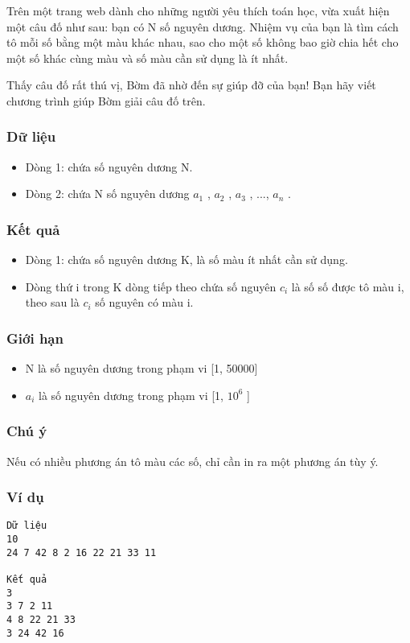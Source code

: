 



   Trên một trang web dành cho những người yêu thích toán học, vừa xuất hiện một câu đố như sau: bạn có N số nguyên dương. Nhiệm vụ của bạn là tìm cách tô mỗi số bằng một màu khác nhau, sao cho một số không bao giờ chia hết cho một số khác cùng màu và số màu cần sử dụng là ít nhất.  

   Thấy câu đố rất thú vị, Bờm đã nhờ đến sự giúp đỡ của bạn! Bạn hãy viết chương trình giúp Bờm giải câu đố trên.  

\subsubsection{   Dữ liệu  }
\begin{itemize}
	\item     Dòng 1: chứa số nguyên dương N.   
	\item     Dòng 2: chứa N số nguyên dương $a_{1}$    , $a_{2}$    , $a_{3}$    , ..., $a_{n}$    .   
\end{itemize}

\subsubsection{   Kết quả  }
\begin{itemize}
	\item     Dòng 1: chứa số nguyên dương K, là số màu ít nhất cần sử dụng.   
	\item     Dòng thứ i trong K dòng tiếp theo chứa số nguyên $c_{i}$    là số số được tô màu i, theo sau là $c_{i}$    số nguyên có màu i.   
\end{itemize}

\subsubsection{   Giới hạn  }
\begin{itemize}
	\item     N là số nguyên dương trong phạm vi [1, 50000]   
	\item     $a_{i}$    là số nguyên dương trong phạm vi [1, $10^{6}$    ]   
\end{itemize}

\subsubsection{   Chú ý  }

   Nếu có nhiều phương án tô màu các số, chỉ cần in ra một phương án tùy ý.  

\subsubsection{   Ví dụ  }
\begin{verbatim}
Dữ liệu
10
24 7 42 8 2 16 22 21 33 11	

Kết quả
3
3 7 2 11 
4 8 22 21 33 
3 24 42 16
\end{verbatim}
